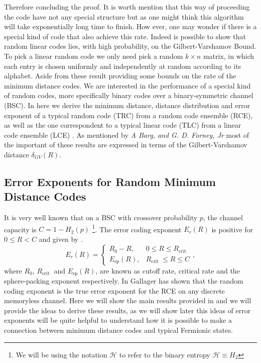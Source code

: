 \indent Therefore concluding the proof. It is worth mention that this way of proceeding the code have not any special structure but as one might think this algorithm will take exponentially long time to finish. How ever, one may wonder if there is a special kind of code that also achieve this rate. Indeed is possible to show that random linear codes lies, with high probability, on the Gilbert-Varshamov Bound. To pick a linear random code we only need pick a random $k\times n $ matrix, in which each entry is chosen uniformly and independently at random according to its alphabet\cite{mackay_information_2003,jaynes_probability_2003}. Aside from these result providing some bounds on the rate of the minimum distance codes. We are interested in the performance of a special kind of random codes, more specifically binary codes over a binary-symmetric channel (BSC). In here we derive the minimum distance, distance distribution and error exponent of a typical random code (TRC) from a random code ensemble (RCE), as well as the one correspondent to a typical linear code (TLC) from a linear code ensemble (LCE) \cite{barg_random_2002}. As mentioned by \textit{A Barg, and G. D. Forney, Jr} most of the important of these results are expressed in terms of the Gilbert-Varshamov distance  $\delta_{GV}(R)$.
\subsection{Error Exponents for Random Minimum Distance Codes}
It is very well known that on a BSC with crossover probability $p$, the channel capacity is $C=1-H_2(p)$ \footnote{We will be using the notation $\mathcal{H}$ to refer to the binary entropy $\mathcal{H}\equiv H_2$ }. The error coding exponent $E_r(R)$ is positive for $0\leq R < C$ and given by \cite{gallager_low-density_1962,gallager_information_1968}.
\begin{equation}
E_{r}(R)=\left\{\begin{array}{ll}
R_{0}-R, & 0 \leq R \leq R_{\text {crit }} \\
E_{\mathrm{sp}}(R), & R_{\text {crit }} \leq R \leq C
\end{array}\right.,
\end{equation}
where $R_0$,  $R_{\text {crit }}$ and $E_{\mathrm{sp}}(R)$, are known as cutoff rate, critical rate and the sphere-packing exponent respectively. In \cite{gallager_random_2006} Gallager has shown that the random coding exponent is the true error exponent for the RCE   on any discrete memoryless channel. Here we will show the main results provided in \cite{barg_random_2002} and we will provide the ideas to derive these results, as we will show later this ideas of error exponents will be quite helpful to understand how it is possible to make a connection between minimum distance codes and typical Fermionic  states.
